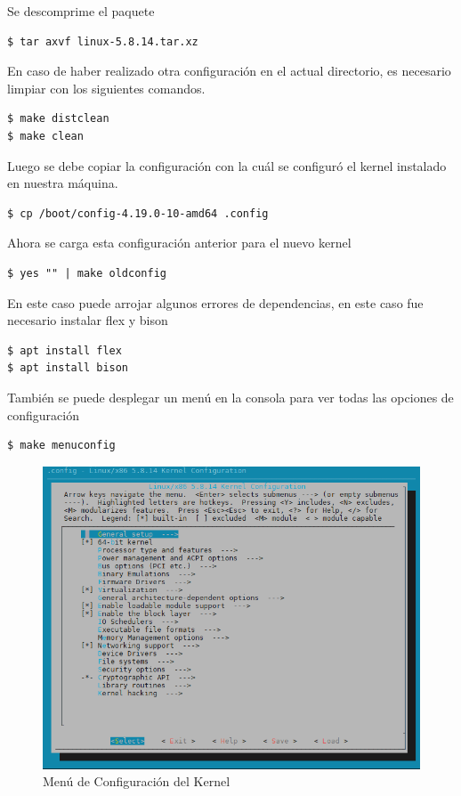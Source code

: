 \documentclass[12pt]{article}
\begin{document}
Se descomprime el paquete

\begin{lstlisting}[frame=single]
$ tar axvf linux-5.8.14.tar.xz
\end{lstlisting}

En caso de haber realizado otra configuración en el actual directorio, es necesario limpiar con los siguientes comandos.

\begin{lstlisting}[frame=single]
$ make distclean
$ make clean
\end{lstlisting}

Luego se debe copiar la configuración con la cuál se configuró el kernel instalado en nuestra máquina.
\begin{lstlisting}[frame=single]
$ cp /boot/config-4.19.0-10-amd64 .config
\end{lstlisting}

Ahora se carga esta configuración anterior para el nuevo kernel
\begin{lstlisting}[frame=single]
$ yes "" | make oldconfig
\end{lstlisting}

En este caso puede arrojar algunos errores de dependencias, en este caso fue necesario instalar flex y bison

\begin{lstlisting}[frame=single]
$ apt install flex
$ apt install bison
\end{lstlisting}

También se puede desplegar un menú en la consola para ver todas las opciones de configuración 
\begin{lstlisting}[frame=single]
$ make menuconfig
\end{lstlisting}

\newpage
\begin{figure}[!h]
   \centering
   \includegraphics[scale=.39]{imgs/config_kernel2.png}
   \caption{Menú de Configuración del Kernel}
   \label{fig3}
\end{figure}
\end{document}
